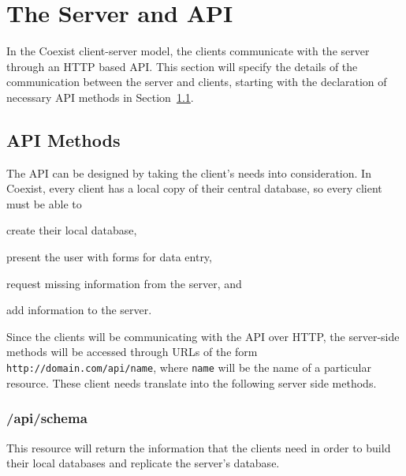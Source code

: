 \section{The Server and API} \label{sec:api}

In the Coexist client-server model, the clients communicate with the server
through an HTTP based API. This section will specify the details of the
communication between the server and clients, starting with the declaration of
necessary API methods in Section~\ref{sec:api_methods}.


\subsection{API Methods}  \label{sec:api_methods}



The API can be designed by taking the client's needs into
consideration. In Coexist, every client has a local copy of their central
database, so every client must be able to
\begin{inparaenum}
\item create their local database,
\item present the user with forms for data entry,
\item request missing information from the server, and
\item add information to the server.
\end{inparaenum}
Since the clients will be communicating with the API over HTTP, the server-side
methods will be accessed through URLs of the form
\mbox{\texttt{http://domain.com/api/name}}, where \texttt{name} will be
the name of a particular resource. These client needs translate into the
following server side methods.

\subsubsection{/api/schema}  \label{sec:api_schema}
This resource will return the information that the clients need in order to
build their local databases and replicate the server's database.

